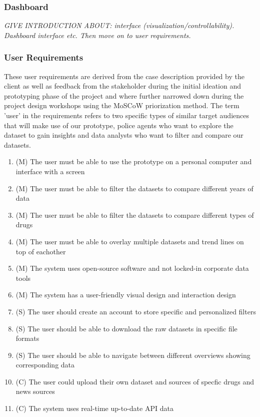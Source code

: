 \subsubsection{Dashboard}

 \textit{GIVE INTRODUCTION ABOUT:  interface (visualization/controllability). Dashboard interface etc. Then move on to user requirements.}

\subsubsection{User Requirements}

These user requirements are derived from the case description provided by the client as well as feedback from the stakeholder during the initial ideation and prototyping phase of the project and where further narrowed down during the project design workshops using the MoSCoW priorization method. The term 'user' in the requirements refers to two specific types of similar target audiences that will make use of our prototype, police agents who want to explore the dataset to gain insights and data analysts who want to filter and compare our datasets.

 \begin{enumerate}
   \item (M) The user must be able to use the prototype on a personal computer and interface with a screen
   \item (M) The user must be able to filter the datasets to compare different years of data
   \item (M) The user must be able to filter the datasets to compare different types of drugs
   \item (M) The user must be able to overlay multiple datasets and trend lines on top of eachother
   \item (M) The system uses open-source software and not locked-in corporate data tools
   \item (M) The system has a user-friendly visual design and interaction design
   \item (S) The user should create an account to store specific and personalized filters
   \item (S) The user should be able to download the raw datasets in specific file formats
   \item (S) The user should be able to navigate between different overviews showing corresponding data
   \item (C) The user could upload their own dataset and sources of specfic drugs and news sources
   \item (C) The system uses real-time up-to-date API data
 \end{enumerate}

